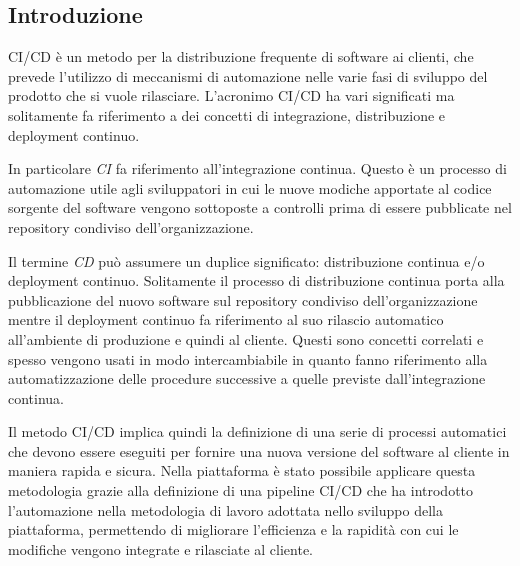 \subsection{Introduzione}
CI/CD è un metodo per la distribuzione frequente di software ai clienti, che prevede l'utilizzo di meccanismi
di automazione nelle varie fasi di sviluppo del prodotto che si vuole rilasciare.
L'acronimo CI/CD ha vari significati ma solitamente fa riferimento a dei concetti di integrazione, distribuzione
e deployment continuo.

In particolare \textit{CI} fa riferimento all'integrazione continua. Questo è un processo di automazione
utile agli sviluppatori in cui le nuove modiche apportate al codice sorgente del software vengono
sottoposte a controlli prima di essere pubblicate nel repository condiviso dell'organizzazione.

Il termine \textit{CD} può assumere un duplice significato: distribuzione continua e/o deployment continuo.
Solitamente il processo di distribuzione continua porta alla pubblicazione del nuovo software sul repository condiviso dell'organizzazione
mentre il deployment continuo fa riferimento al suo rilascio automatico all'ambiente di produzione e quindi al cliente.
Questi sono concetti correlati e spesso vengono usati in modo intercambiabile in quanto fanno riferimento
alla automatizzazione delle procedure successive a quelle previste dall'integrazione continua.

Il metodo CI/CD implica quindi la definizione di una serie di processi automatici che devono
essere eseguiti per fornire una nuova versione del software al cliente in maniera rapida e sicura.
Nella piattaforma è stato possibile applicare questa metodologia grazie alla definizione di una pipeline CI/CD che ha
introdotto l'automazione nella metodologia di lavoro adottata nello sviluppo
della piattaforma, permettendo di migliorare l'efficienza e la rapidità con cui le modifiche vengono
integrate e rilasciate al cliente.